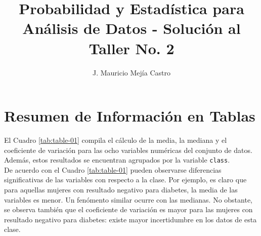 \documentclass[11pt,letterpaper]{article}
\author{J. Mauricio Mejía Castro}
\title{Probabilidad y Estadística para Análisis de Datos - Solución al Taller No. 2}
\begin{document}
\maketitle

\section{Resumen de Información en Tablas}
El Cuadro \ref{tab:table-01} compila el cálculo de la media, la mediana y el coeficiente de variación para las ocho variables numéricas del conjunto de datos. Además, estos resultados se encuentran agrupados por la variable {\tt class}. \\
De acuerdo con el Cuadro \ref{tab:table-01} pueden observarse diferencias significativas de las variables con respecto a la clase. Por ejemplo, es claro que para aquellas mujeres con resultado negativo para diabetes, la media de las variables es menor. Un fenómento similar ocurre con las medianas. No obstante, se observa también que el coeficiente de variación es mayor para las mujeres con resultado negativo para diabetes: existe mayor incertidumbre en los datos de esta clase.
\end{document}
